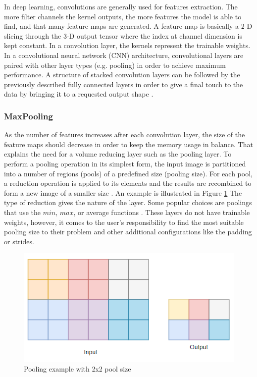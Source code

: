 In deep learning, convolutions are generally used for features extraction. The more filter channels the kernel outputs, the more features the model is able to find, and that many feature maps are generated. A feature map is basically a 2-D slicing through the 3-D output tensor where the index at channel dimension is kept constant. In a convolution layer, the kernels represent the trainable weights. In a convolutional neural network (CNN) architecture, convolutional layers are paired with other layer types (e.g. pooling) in order to achieve maximum performance. A structure of stacked convolution layers can be followed by the previously described fully connected layers in order to give a final touch to the data by bringing it to a requested output shape \cite{cnn}.

\subsubsection{MaxPooling}
\label{subsubsec:ch3sec3subsec3subsubsec2}

As the number of features increases after each convolution layer, the size of the feature maps should decrease in order to keep the memory usage in balance. That explains the need for a volume reducing layer such as the pooling layer. To perform a pooling operation in its simplest form, the input image is partitioned into a number of regions (pools) of a predefined size (pooling size). For each pool, a reduction operation is applied to its elements and the results are recombined to form a new image of a smaller size \cite{cnn}. An example is illustrated in Figure \ref{FigPooling} The type of reduction gives the nature of the layer. Some popular choices are poolings that use the $min$, $max$, or average functions \cite{Tensorflow}. These layers do not have trainable weights, however, it comes to the user's responsibility to find the most suitable pooling size to their problem and other additional configurations like the padding or strides.

\begin{figure}[htbp]
    \centering
        \includegraphics[scale=0.8]{figures/pooling.PNG}
    \caption{Pooling example with 2x2 pool size}
    \label{FigPooling}
\end{figure}

